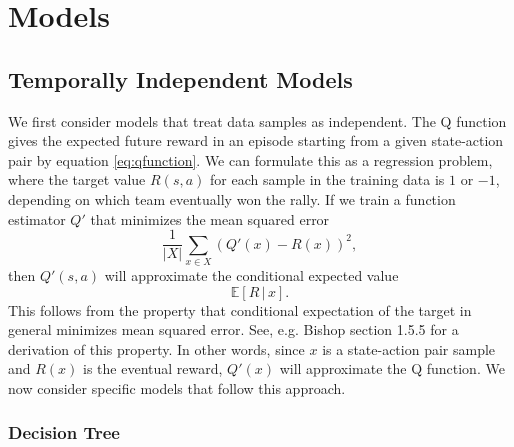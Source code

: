\documentclass{sfuthesis}
\begin{document}
	
	\chapter{Models}
	
	\section{Temporally Independent Models}
	
	We first consider models that treat data samples as independent. The Q function gives the expected future reward in an episode starting from a given state-action pair by equation \eqref{eq:qfunction}. We can formulate this as a regression problem, where the target value $R(s,a)$ for each sample in the training data is $1$ or $-1$, depending on which team eventually won the rally. If we train a function estimator $Q'$ that minimizes the mean squared error
	\begin{equation}
		\frac{1}{|X|}\sum_{x \in X} (Q'(x) - R(x))^2,
		\label{eq:mse}
	\end{equation}
	then $Q'(s,a)$ will approximate the conditional expected value
	$$\mathbb{E} \left[R \, | \, x \right].$$
	This follows from the property that conditional expectation of the target in general minimizes mean squared error. See, e.g. Bishop \cite{bishop2006pattern} section 1.5.5 for a derivation of this property. In other words, since $x$ is a state-action pair sample and $R(x)$ is the eventual reward, $Q'(x)$ will approximate the Q function. We now consider specific models that follow this approach.
	
	\subsection{Decision Tree}
	
\end{document}
